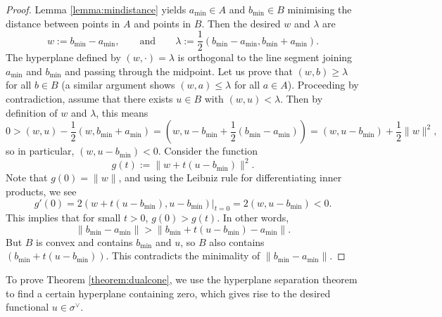 \documentclass[12pt]{amsart}
\theoremstyle{plain}
\begin{document}
\begin{proof}
Lemma \ref{lemma:mindistance} yields $a_{\text{min}} \in A$ and $b_{\text{min}} \in B$ minimising the distance between points in $A$ and points in $B$.
Then the desired $w$ and $\lambda$ are
$$w := b_{\text{min}} - a_{\text{min}}, \qquad\text{and}\qquad \lambda := \frac{1}{2}(b_{\text{min}} - a_{\text{min}}, b_{\text{min}} + a_{\text{min}}).$$
The hyperplane defined by $(w, \cdot) = \lambda$ is orthogonal to the line segment joining $a_{\text{min}}$ and $b_{\text{min}}$ and passing through the midpoint.
Let us prove that $(w, b) \ge \lambda$ for all $b \in B$ (a similar argument shows $(w, a) \le \lambda$ for all $a \in A$).
Proceeding by contradiction, assume that there exists $u \in B$ with $(w, u) < \lambda$.
Then by definition of $w$ and $\lambda$, this means 
$$0 > (w, u) -\frac{1}{2}(w, b_{\text{min}}+a_{\text{min}}) = (w, u-b_{\text{min}}+\frac{1}{2} (b_{\text{min}}-a_{\text{min}})) =(w, u-b_{\text{min}})+\frac{1}{2}\|w\|^2,$$
so in particular, $(w, u-b_{\text{min}})<0$.
Consider the function
$$g(t):=\|w+t(u-b_{\text{min}})\|^2.$$
Note that $g(0)=\|w\|$, and using the Leibniz rule for differentiating inner products, we see
$$g'(0) = 2 (w+t(u-b_{\text{min}}), u-b_{\text{min}}) \big|_{t=0} = 2 (w, u-b_{\text{min}}) < 0.$$
This implies that for small $t > 0$, $g(0) > g(t)$.
In other words,
$$\|b_{\text{min}} - a_{\text{min}}\| > \|b_{\text{min}} + t(u - b_{\text{min}}) - a_{\text{min}}\|.$$
But $B$ is convex and contains $b_{\text{min}}$ and $u$, so $B$ also contains $(b_{\text{min}} + t (u - b_{\text{min}}))$.
This contradicts the minimality of $\|b_{\text{min}} - a_{\text{min}}\|$.
\end{proof}

To prove Theorem \ref{theorem:dualcone}, we use the hyperplane separation theorem to find a certain hyperplane containing zero, which gives rise to the desired functional $u\in\sigma^\vee$.
\end{document}
